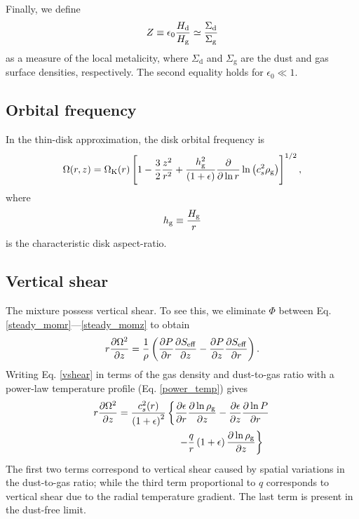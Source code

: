Finally, we define 
\begin{align}
  Z \equiv \epsilon_0\frac{H_\mathrm{d}}{H_\mathrm{g}} \simeq
  \frac{\Sigma_\mathrm{d}}{\Sigma_\mathrm{g}} 
\end{align}
as a measure of the local metalicity, where $\Sigma_\mathrm{d}$ and
$\Sigma_\mathrm{g}$ are the dust and gas surface densities,
respectively. The second equality holds for $\epsilon_0\ll1$.  


\subsection{Orbital frequency} 
In the thin-disk approximation, the disk orbital frequency is 
\begin{align}
  \Omega(r,z) = \Omega_{\rm K}(r)\left[1 - \frac{3}{2}\frac{z^2}{r^2} +
    \frac{h_\mathrm{g}^2}{\left(1+\epsilon\right)}\frac{\partial}{\partial\ln{r}}\ln{\left(c_s^2\rho_\mathrm{g}\right)}
    \right]^{1/2}, 
\end{align}
where 
\begin{align}
  h_\mathrm{g} \equiv \frac{H_\mathrm{g}}{r}
\end{align}
is the characteristic disk aspect-ratio. 

\subsection{Vertical shear}\label{vertshear}
The mixture possess vertical shear. To see this, we eliminate $\Phi$
between Eq. \ref{steady_momr}---\ref{steady_momz} to 
obtain 
\begin{align}\label{vshear}
  r\frac{\partial \Omega^2}{\partial z} 
   = \frac{1}{\rho}\left(\frac{\partial P}{\partial r}\frac{\partial S_\mathrm{eff}}{\partial z} -\frac{\partial
    P}{\partial z}\frac{\partial S_\mathrm{eff}}{\partial r} \right). 
\end{align}
Writing Eq. \ref{vshear} in terms of the gas density and dust-to-gas
ratio with a power-law temperature profile (Eq. \ref{power_temp}) gives 
\begin{align}\label{vshear2}
  &r\frac{\p \Omega^2}{\p z}  =
  \frac{c_s^2(r)}{\left(1+\epsilon\right)^2}\left\{
  \frac{\p\epsilon}{\p r}\frac{\p\ln{\rhog}}{\p z}
 -\frac{\p\epsilon}{\p z}\frac{\p\ln{P}}{\p r}\right.\notag\\
  &\phantom{ r\frac{\p \Omega^2}{\p z}  =
    \frac{c_s^2(r)}{\left(1+\epsilon\right)^2}\left\{\right\} }
  \left. -\frac{q}{r} \left(1+\epsilon\right)\frac{\p\ln{\rhog}}{\p z} \right\} 
\end{align}
The first two terms correspond to vertical shear caused by spatial
variations in the dust-to-gas ratio; while the third term
proportional to $q$ corresponds to vertical shear due to the 
radial temperature gradient. The last term is present in the dust-free
limit. 


